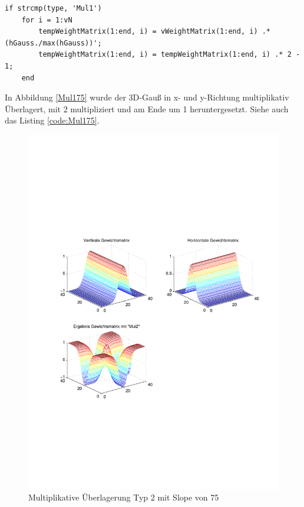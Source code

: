\begin{lstlisting}[label=code:Mul175, caption=Auszug Matlab-Skript 'GetGaussWeights()']
if strcmp(type, 'Mul1')
	for i = 1:vN
		tempWeightMatrix(1:end, i) = vWeightMatrix(1:end, i) .* (hGauss./max(hGauss))';
		tempWeightMatrix(1:end, i) = tempWeightMatrix(1:end, i) .* 2 - 1;
	end
\end{lstlisting}

In Abbildung \ref{Mul175} wurde der 3D-Gauß in x- und y-Richtung multiplikativ Überlagert, mit 2 multipliziert und am Ende um 1 heruntergesetzt. Siehe auch das Listing \ref{code:Mul175}.

\newpage
\begin{figure}[hbt]
	\centering
	\includegraphics[width=1\linewidth]{./Bilder/Auswertung/GewichtmatrixEinzelschritte/Endergebnis_Gewichtsmatrix_Slope_75_Type_Mul2}
	\caption{Multiplikative Überlagerung Typ 2 mit Slope von 75}
	\label{Mul275}
\end{figure}

